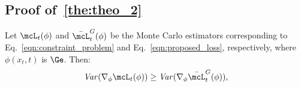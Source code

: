 

\subsection{Proof of~\cref{the:theo_2}}
\label{sub_app:theo_2}


\begingroup
\setcounter{theorem}{0} %
\begin{tcolorbox}[title=Variance Reduction of the Proposed Loss]
\begin{theorem}
Let \(\mcL_t(\phi)\) and \(\bar{\mcL}_t^G(\phi)\) be the Monte Carlo estimators corresponding to Eq.~\eqref{eqn:constraint_problem} and Eq.~\eqref{eqn:proposed_loss}, respectively, where \(\phi(x_t, t)\) is \(\Ge\). Then:
\begin{equation}
    \text{\emph{Var}}(\nabla_\phi \mcL_t(\phi)) \geq \text{\emph{Var}}(\nabla_\phi \bar{\mcL}_t^G(\phi)),
\end{equation}
\end{theorem}
\end{tcolorbox}
\endgroup

